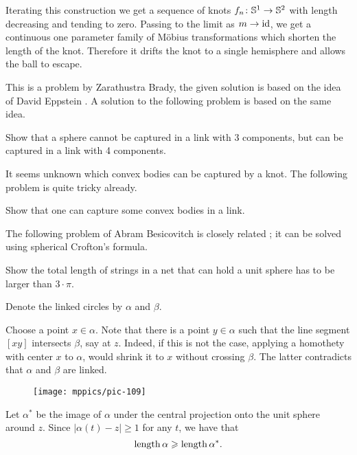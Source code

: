 Iterating this construction we get a sequence of knots $f_n\:\mathbb{S}^1\z\to\mathbb{S}^2$ with length decreasing  and tending to zero.
Passing to the limit as $m\to\operatorname{\rm id}$, we get a continuous one parameter family of M\"obius transformations which shorten the length of the knot.
Therefore it drifts the knot to a single hemisphere and allows the ball to escape. 
\qeds


This is a problem by Zarathustra Brady, 
the given solution is based on the idea of David Eppstein \cite{zeb}.
A solution to the following problem is based on the same idea.

\begin{pr}
Show that a sphere cannot be captured in a link with 3 components, but can be captured in a link with 4 components.
\end{pr}

It seems unknown which convex bodies can be captured by a knot.
The following problem is quite tricky already.

\begin{pr}
Show that one can capture some convex bodies in a link.
\end{pr}

The following problem of Abram Besicovitch is closely related \cite{besicovitch-sphere}; it can be solved using spherical Crofton's formula.

\begin{pr}
Show the total length of strings in a net that can hold a unit sphere has to be larger than $3\cdot\pi$.
\end{pr}







Denote the linked circles by $\alpha$ and $\beta$. 

Choose a point $x\in\alpha$. 
Note that there is a point $y\in\alpha$ such that the line segment 
$[xy]$ intersects $\beta$, say at $z$. 
Indeed, if this is not the case, 
applying a homothety with center $x$ to $\alpha$, would shrink it to $x$ without crossing $\beta$.
The latter contradicts that $\alpha$ and $\beta$ are linked. 

\begin{wrapfigure}{r}{26 mm}
\vskip-2mm
\centering
\texttt{[image: mppics/pic-109]}
\end{wrapfigure}

Let $\alpha^{*}$ be the image of $\alpha$ under the central projection onto the unit sphere around $z$.
Since $|\alpha(t)-z|\ge1$ for any $t$, we have that
$$\operatorname{\rm length} \alpha\geqslant \operatorname{\rm length}\alpha^{*}.$$

